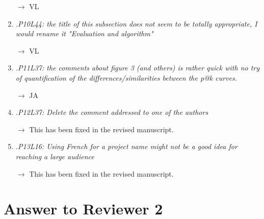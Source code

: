 \documentclass[10pt]{article}
\begin{document}
\begin{enumerate}
$\rightarrow$ VL

\item \emph{.P10L44: the title of this subsection does not seem to be totally appropriate, I would rename it "Evaluation and algorithm"}

$\rightarrow$ VL

\item \emph{.P11L37: the comments about figure 3 (and others) is rather quick with no try of quantification of the differences/similarities between the p@k curves.}

$\rightarrow$ JA

\item \emph{.P12L37: Delete the comment addressed to one of the authors}

$\rightarrow$
This has been fixed in the revised manuscript.

\item \emph{.P13L16: Using French for a project name might not be a good idea for reaching a large audience}

$\rightarrow$
This has been fixed in the revised manuscript.

\end{enumerate}

\section{Answer to Reviewer 2}
\end{document}
